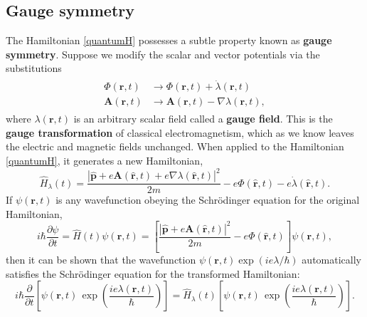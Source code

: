 \documentclass[pra,12pt]{revtex4}
\begin{document}
\subsection{Gauge symmetry}
\label{sec:gauge}

The Hamiltonian \eqref{quantumH} possesses a subtle property known as
\textbf{gauge symmetry}.  Suppose we modify the scalar and vector
potentials via the substitutions
\begin{align}
  \begin{aligned}
    \Phi(\mathbf{r},t) &\rightarrow \Phi(\mathbf{r},t) + \dot{\lambda}(\mathbf{r},t)\\
    \mathbf{A}(\mathbf{r},t) &\rightarrow
    \mathbf{A}(\mathbf{r},t) - \nabla{\lambda}(\mathbf{r},t),
  \end{aligned}
\end{align}
where $\lambda(\mathbf{r},t)$ is an arbitrary scalar field called a
\textbf{gauge field}.  This is the \textbf{gauge transformation} of
classical electromagnetism, which as we know leaves the electric and
magnetic fields unchanged.  When applied to the Hamiltonian
\eqref{quantumH}, it generates a new Hamiltonian,
\begin{equation}
  \hat{H}_\lambda(t)
  = \frac{|\hat{\mathbf{p}}+e\mathbf{A}(\hat{\mathbf{r}},t) + e\nabla\lambda(\hat{\mathbf{r}},t)|^2}{2m}
  - e\Phi(\hat{\mathbf{r}},t) - e\dot{\lambda}(\hat{\mathbf{r}},t).
\end{equation}
If $\psi(\mathbf{r},t)$ is any wavefunction obeying the Schr\"odinger
equation for the original Hamiltonian,
\begin{equation}
  i\hbar\frac{\partial\psi}{\partial t} =
  \hat{H}(t) \psi(\mathbf{r},t)
  = \left[\frac{|\hat{\mathbf{p}}+e\mathbf{A}(\hat{\mathbf{r}},t)|^2}{2m}
  - e\Phi(\hat{\mathbf{r}},t) \right]\psi(\mathbf{r},t),
\end{equation}
then it can be shown that the wavefunction $\psi(\mathbf{r},t)
\exp(ie\lambda/\hbar)$ automatically satisfies the Schr\"odinger
equation for the transformed Hamiltonian:
\begin{equation}
  i\hbar\frac{\partial}{\partial t} \left[\psi(\mathbf{r},t) \, \exp\left(\frac{ie\lambda(\mathbf{r},t)}{\hbar}\right)\right] =
  \hat{H}_\lambda(t) \left[\psi(\mathbf{r},t) \, \exp\left(\frac{ie\lambda(\mathbf{r},t)}{\hbar}\right)\right].
  \label{gaugeschrod}
\end{equation}
\end{document}
